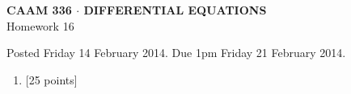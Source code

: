 \documentclass[10pt]{article}
\begin{document}
\vspace*{-5em}
\begin{center}
\large \textsf{\textbf{CAAM 336 $\cdot$ DIFFERENTIAL EQUATIONS}\\[0.5em]
Homework 16 }
\end{center}

Posted Friday 14 February 2014.  Due 1pm Friday 21 February 2014.

\begin{enumerate}\addtocounter{enumi}{15}
\item {[25 points]}  
\end{enumerate}
\end{document}

